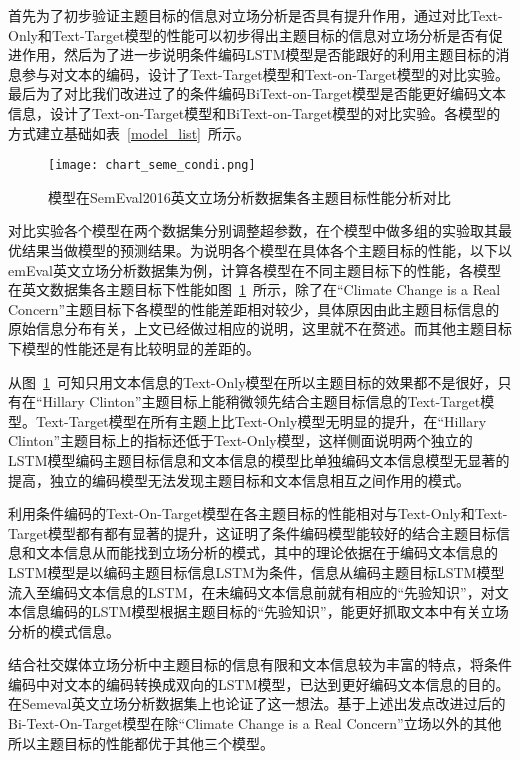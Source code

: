 首先为了初步验证主题目标的信息对立场分析是否具有提升作用，通过对比Text-Only和Text-Target模型的性能可以初步得出主题目标的信息对立场分析是否有促进作用，然后为了进一步说明条件编码LSTM模型是否能跟好的利用主题目标的消息参与对文本的编码，设计了Text-Target模型和Text-on-Target模型的对比实验。最后为了对比我们改进过了的条件编码BiText-on-Target模型是否能更好编码文本信息，设计了Text-on-Target模型和BiText-on-Target模型的对比实验。各模型的方式建立基础如表~\ref{model_list}~所示。


\begin{figure}[htbp]
	\centering
	\texttt{[image: chart\_seme\_condi.png]}
	\caption[rnn_vanish]{模型在SemEval2016英文立场分析数据集各主题目标性能分析对比}
	\label{semeval_model_char}
\end{figure}


对比实验各个模型在两个数据集分别调整超参数，在个模型中做多组的实验取其最优结果当做模型的预测结果。为说明各个模型在具体各个主题目标的性能，以下以emEval英文立场分析数据集为例，计算各模型在不同主题目标下的性能，各模型在英文数据集各主题目标下性能如图~\ref{semeval_model_char}~所示，除了在“Climate Change is a Real Concern”主题目标下各模型的性能差距相对较少，具体原因由此主题目标信息的原始信息分布有关，上文已经做过相应的说明，这里就不在赘述。而其他主题目标下模型的性能还是有比较明显的差距的。

从图~\ref{semeval_model_char}~可知只用文本信息的Text-Only模型在所以主题目标的效果都不是很好，只有在“Hillary Clinton”主题目标上能稍微领先结合主题目标信息的Text-Target模型。Text-Target模型在所有主题上比Text-Only模型无明显的提升，在“Hillary Clinton”主题目标上的指标还低于Text-Only模型，这样侧面说明两个独立的LSTM模型编码主题目标信息和文本信息的模型比单独编码文本信息模型无显著的提高，独立的编码模型无法发现主题目标和文本信息相互之间作用的模式。

利用条件编码的Text-On-Target模型在各主题目标的性能相对与Text-Only和Text-Target模型都有都有显著的提升，这证明了条件编码模型能较好的结合主题目标信息和文本信息从而能找到立场分析的模式，其中的理论依据在于编码文本信息的LSTM模型是以编码主题目标信息LSTM为条件，信息从编码主题目标LSTM模型流入至编码文本信息的LSTM，在未编码文本信息前就有相应的“先验知识”，对文本信息编码的LSTM模型根据主题目标的“先验知识”，能更好抓取文本中有关立场分析的模式信息。

结合社交媒体立场分析中主题目标的信息有限和文本信息较为丰富的特点，将条件编码中对文本的编码转换成双向的LSTM模型，已达到更好编码文本信息的目的。在Semeval英文立场分析数据集上也论证了这一想法。基于上述出发点改进过后的Bi-Text-On-Target模型在除“Climate Change is a Real Concern”立场以外的其他所以主题目标的性能都优于其他三个模型。


